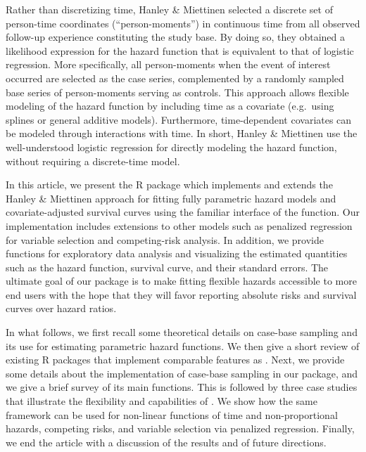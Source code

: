 Rather than discretizing time, Hanley \& Miettinen
\citeyearpar{hanley2009fitting} selected a discrete set of person-time
coordinates (``person-moments'') in continuous time from all observed
follow-up experience constituting the study base. By doing so, they
obtained a likelihood expression for the hazard function that is
equivalent to that of logistic regression. More specifically, all
person-moments when the event of interest occurred are selected as the
case series, complemented by a randomly sampled base series of
person-moments serving as controls. This approach allows flexible
modeling of the hazard function by including time as a covariate
(e.g.~using splines or general additive models). Furthermore,
time-dependent covariates can be modeled through interactions with time.
In short, Hanley \& Miettinen \citeyearpar{hanley2009fitting} use the
well-understood logistic regression for directly modeling the hazard
function, without requiring a discrete-time model.

In this article, we present the  R package
\citep{casebase-package} which implements and extends the Hanley \&
Miettinen \citeyearpar{hanley2009fitting} approach for fitting fully
parametric hazard models and covariate-adjusted survival curves using
the familiar interface of the  function. Our implementation
includes extensions to other models such as penalized regression for
variable selection and competing-risk analysis. In addition, we provide
functions for exploratory data analysis and visualizing the estimated
quantities such as the hazard function, survival curve, and their
standard errors. The ultimate goal of our package is to make fitting
flexible hazards accessible to more end users with the hope that they
will favor reporting absolute risks and survival curves over hazard
ratios.

In what follows, we first recall some theoretical details on case-base
sampling and its use for estimating parametric hazard functions. We then
give a short review of existing R packages that implement comparable
features as . Next, we provide some details about the
implementation of case-base sampling in our package, and we give a brief
survey of its main functions. This is followed by three case studies
that illustrate the flexibility and capabilities of . We
show how the same framework can be used for non-linear functions of time
and non-proportional hazards, competing risks, and variable selection
via penalized regression. Finally, we end the article with a discussion
of the results and of future directions.

